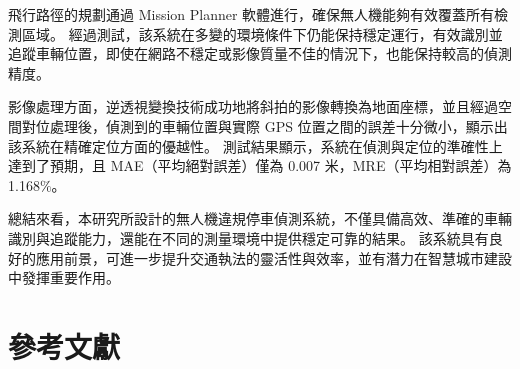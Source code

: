 \documentclass[12pt]{article}       %
\begin{document}
飛行路徑的規劃通過 Mission Planner 軟體進行，確保無人機能夠有效覆蓋所有檢測區域。
經過測試，該系統在多變的環境條件下仍能保持穩定運行，有效識別並追蹤車輛位置，即使在網路不穩定或影像質量不佳的情況下，也能保持較高的偵測精度。

影像處理方面，逆透視變換技術成功地將斜拍的影像轉換為地面座標，並且經過空間對位處理後，偵測到的車輛位置與實際 GPS 位置之間的誤差十分微小，顯示出該系統在精確定位方面的優越性。
測試結果顯示，系統在偵測與定位的準確性上達到了預期，且 MAE（平均絕對誤差）僅為 0.007 米，MRE（平均相對誤差）為 1.168$\%$。

總結來看，本研究所設計的無人機違規停車偵測系統，不僅具備高效、準確的車輛識別與追蹤能力，還能在不同的測量環境中提供穩定可靠的結果。
該系統具有良好的應用前景，可進一步提升交通執法的靈活性與效率，並有潛力在智慧城市建設中發揮重要作用。

\section{\centering 參考文獻}
\vspace{-3.5em}  %
\renewcommand{\refname}{}  %
\printbibliography  %
\end{document}
